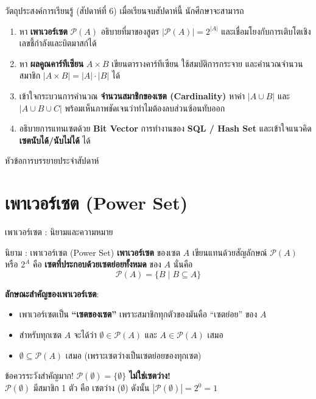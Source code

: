 \begin{frame}{วัตถุประสงค์การเรียนรู้ (สัปดาห์ที่ 6)}
  เมื่อเรียนจบสัปดาห์นี้ นักศึกษาจะสามารถ
  \begin{enumerate}
    \item หา \textbf{เพาเวอร์เซต} $\mathcal{P}(A)$ อธิบายที่มาของสูตร $|\mathcal{P}(A)| = 2^{|A|}$ และเชื่อมโยงกับการเติบโตเชิงเลขชี้กำลังและบิตมาสก์ได้
    \item หา \textbf{ผลคูณคาร์ทีเซียน} $A \times B$ เขียนตารางคาร์ทีเซียน ใช้สมบัติการกระจาย และคำนวณจำนวนสมาชิก $|A \times B| = |A| \cdot |B|$ ได้
    \item เข้าใจกระบวนการคำนวณ \textbf{จำนวนสมาชิกของเซต (Cardinality)} หาค่า \textbf{$|A \cup B|$} และ \textbf{$|A \cup B \cup C|$} พร้อมเห็นภาพชัดเจนว่าทำไมต้องลบส่วนซ้อนทับออก
    \item อธิบายการแทนเซตด้วย \textbf{Bit Vector} การทำงานของ \textbf{SQL / Hash Set} และเข้าใจแนวคิด \textbf{เซตนับได้/นับไม่ได้} ได้
  \end{enumerate}
\end{frame}

\begin{frame}{หัวข้อการบรรยายประจำสัปดาห์}
  \tableofcontents
\end{frame}


\section{เพาเวอร์เซต (Power Set)}

\begin{frame}{เพาเวอร์เซต : นิยามและความหมาย}
  \begin{block}{นิยาม : เพาเวอร์เซต (Power Set)}
    \textbf{เพาเวอร์เซต} ของเซต $A$ เขียนแทนด้วยสัญลักษณ์ $\mathcal{P}(A)$ หรือ $2^A$ คือ
    \textbf{เซตที่ประกอบด้วยเซตย่อยทั้งหมด} ของ $A$ นั่นคือ
    \[ \mathcal{P}(A) = \{B \mid B \subseteq A\} \]
  \end{block}
  \vspace{0.2em}
  \textbf{ลักษณะสำคัญของเพาเวอร์เซต}:
  \begin{itemize}
    \item เพาเวอร์เซตเป็น \textbf{``เซตของเซต''} เพราะสมาชิกทุกตัวของมันคือ ``เซตย่อย'' ของ $A$
    \item สำหรับทุกเซต $A$ จะได้ว่า $\emptyset \in \mathcal{P}(A)$ และ $A \in \mathcal{P}(A)$ เสมอ
    \item $\emptyset \subseteq \mathcal{P}(A)$ เสมอ (เพราะเซตว่างเป็นเซตย่อยของทุกเซต)
  \end{itemize}
  \vspace{0.2em}
  \begin{alertblock}{ข้อควรระวังสำคัญมาก!}
    $\mathcal{P}(\emptyset) = \{\emptyset\}$ \quad \textbf{ไม่ใช่เซตว่าง!} \\
    $\mathcal{P}(\emptyset)$ มีสมาชิก 1 ตัว คือ เซตว่าง ($\emptyset$) ดังนั้น $|\mathcal{P}(\emptyset)| = 2^0 = 1$
  \end{alertblock}
\end{frame}

